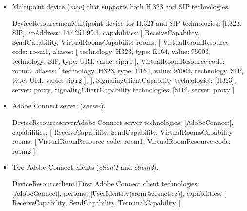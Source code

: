 \begin{itemize}
\begin{EntityExample}{DeviceResource}{userAgent1}{First SIP user agent}
technologies: [SIP],
aliases: [{type: URI, value: sip:a1}],
dependentResources: [room2],
capabilities: [
  ReceiveCapability, SendCapability,
  StandaloneTerminalCapability,
  SignalingClientCapability {server: proxy}
]
\end{EntityExample}

\begin{EntityExample}{DeviceResource}{userAgent2}{Second SIP user agent}
technologies: [SIP],
aliases: [{type: URI, value: sip:a2}],
capabilities: [
  ReceiveCapability, SendCapability,
  StandaloneTerminalCapability,
  SignalingClientCapability {server: proxy}
]
\end{EntityExample}

\item Multipoint device (\emph{mcu}) that supports both H.323 and SIP 
  technologies.
  
\begin{EntityExample}{DeviceResource}{mcu}{Multipoint device for H.323 and SIP}
technologies: [H323, SIP], 
ipAddress: 147.251.99.3,
capabilities: [
  ReceiveCapability, SendCapability,
  VirtualRoomsCapability {rooms: [
    VirtualRoomResource {code: room1, aliases: [
      {technology: H323, type: E164, value: 95003},
      {technology: SIP, type: URI, value: sip:r1}
    ]},
    VirtualRoomResource {code: room2, aliases: [
      {technology: H323, type: E164, value: 95004},
      {technology: SIP, type: URI, value: sip:r2}
    ]},
  ]},
  SignalingClientCapability {technologies: [H323], server: proxy},
  SignalingClientCapability {technologies: [SIP], server: proxy}
]
\end{EntityExample}

\item Adobe Connect server (\emph{server}).

\begin{EntityExample}{DeviceResource}{server}{Adobe Connect server}
technologies: [AdobeConnect],
capabilities: [
  ReceiveCapability, SendCapability,
  VirtualRoomsCapability {rooms: [ 
    VirtualRoomResource {code: room1}, 
    VirtualRoomResource {code: room2}
  ]}
]
\end{EntityExample}

\item Two Adobe Connect clients (\emph{client1} and \emph{client2}).

\begin{EntityExample}{DeviceResource}{client1}{First Adobe Connect client}
technologies: [AdobeConnect], 
persons: [UserIdentity(srom@cesnet.cz)],
capabilities: [
  ReceiveCapability, SendCapability, TerminalCapability
]
\end{EntityExample}


\end{itemize}
